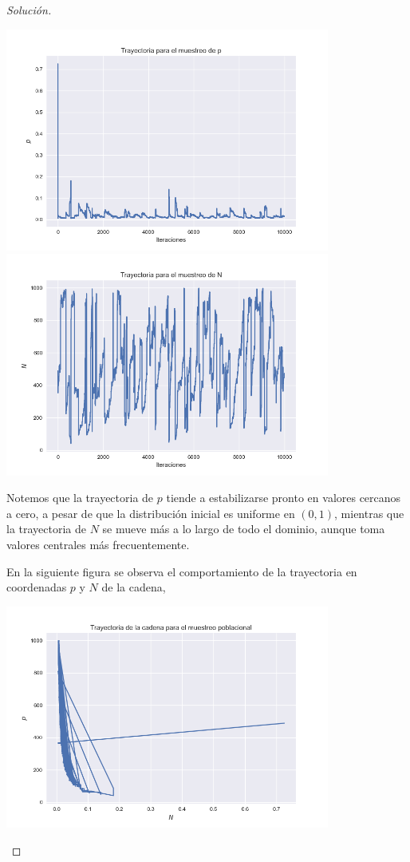 \documentclass{article}
\begin{document}
\begin{enumerate}
\begin{proof}[Solución]
        \begin{center}
            \includegraphics[width=0.8\textwidth]{Tarea9/trajp.png}
            \includegraphics[width=0.8\textwidth]{Tarea9/trajN.png}
        \end{center}

        Notemos que la trayectoria de $p$ tiende a estabilizarse pronto en valores cercanos 
        a cero, a pesar de que la distribución inicial es uniforme en $(0,1)$, mientras que 
        la trayectoria de $N$ se mueve más a lo largo de todo el dominio, aunque toma valores
        centrales más frecuentemente.

        En la siguiente figura se observa el comportamiento de la trayectoria en coordenadas
        $p$ y $N$ de la cadena,

        \begin{center}
            \includegraphics[width=0.8\textwidth]{Tarea9/trajpN.png}
        \end{center}


\end{proof}
\end{enumerate}
\end{document}
